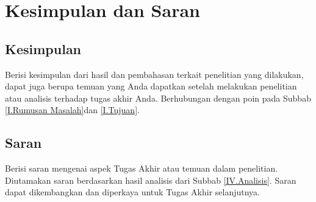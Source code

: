 \newpage
\chapter{Kesimpulan dan Saran} \label{Bab V}

\section{Kesimpulan} \label{V.Kesimpulan}
Berisi kesimpulan dari hasil dan pembahasan terkait penelitian yang dilakukan, dapat juga berupa temuan yang Anda dapatkan setelah melakukan penelitian atau analisis terhadap tugas akhir Anda. Berhubungan dengan poin pada Subbab \ref{I.Rumusan Masalah}dan \ref{I.Tujuan}. 

\section{Saran} \label{V.Saran}
Berisi saran mengenai aspek Tugas Akhir atau temuan dalam penelitian. Diutamakan saran berdasarkan hasil analisis dari Subbab \ref{IV.Analisis}. Saran dapat dikembangkan dan diperkaya untuk Tugas Akhir selanjutnya. 